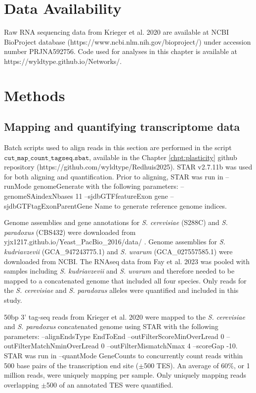 \section{Data Availability}

Raw RNA sequencing data from Krieger et al. 2020 are available at NCBI BioProject database (https://www.ncbi.nlm.nih.gov/bioproject/) under accession number PRJNA592756. Code used for analyses in this chapter is available at https://wyldtype.github.io/Networks/.

\section{Methods}

\subsection{Mapping and quantifying transcriptome data}

Batch scripts used to align reads in this section are performed in the script $\texttt{cut\_map\_count\_tagseq.sbat}$, available in the Chapter \ref{chpt:plasticity} github repository (https://github.com/wyldtype/Redhuis2025). STAR v2.7.11b was used for both aligning and quantification. Prior to aligning, STAR was run in --runMode genomeGenerate with the following parameters: --genomeSAindexNbases 11 --sjdbGTFfeatureExon gene --sjdbGTFtagExonParentGene Name to generate reference genome indices.

Genome assemblies and gene annotations for \textit{S. cerevisiae} (S288C) and \textit{S. paradoxus} (CBS432) were downloaded from yjx1217.github.io/Yeast\_PacBio\_2016/data/ \cite{Yue2017}. Genome assemblies for \textit{S. kudriavzevii} (GCA\_947243775.1) and \textit{S. uvarum} (GCA\_027557585.1) were downloaded from NCBI. The RNAseq data from Fay et al. 2023 was pooled with samples including \textit{S. kudriavzevii} and \textit{S. uvarum} and therefore needed to be mapped to a concatenated genome that included all four species. Only reads for the \textit{S. cerevisiae} and \textit{S. paradoxus} alleles were quantified and included in this study.

50bp 3' tag-seq reads from Krieger et al. 2020 were mapped to the \textit{S. cerevisiae} and \textit{S. paradoxus} concatenated genome using STAR with the following parameters: --alignEndsType EndToEnd --outFilterScoreMinOverLread 0  --outFilterMatchNminOverLread 0 --outFilterMismatchNmax 4  --scoreGap -10. STAR was run in --quantMode GeneCounts to concurrently count reads within 500 base pairs of the transcription end site ($\pm$500 TES). An average of 60\%, or 1 million reads, were uniquely mapping per sample. Only uniquely mapping reads overlapping $\pm$500 of an annotated TES were quantified.

